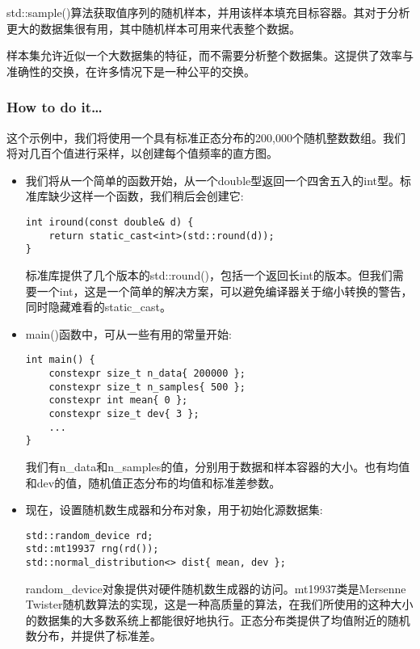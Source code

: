 
std::sample()算法获取值序列的随机样本，并用该样本填充目标容器。其对于分析更大的数据集很有用，其中随机样本可用来代表整个数据。

样本集允许近似一个大数据集的特征，而不需要分析整个数据集。这提供了效率与准确性的交换，在许多情况下是一种公平的交换。

\subsubsection{How to do it…}

这个示例中，我们将使用一个具有标准正态分布的200,000个随机整数数组。我们将对几百个值进行采样，以创建每个值频率的直方图。

\begin{itemize}
\item 
我们将从一个简单的函数开始，从一个double型返回一个四舍五入的int型。标准库缺少这样一个函数，我们稍后会创建它:

\begin{lstlisting}[style=styleCXX]
int iround(const double& d) {
	return static_cast<int>(std::round(d));
}
\end{lstlisting}

标准库提供了几个版本的std::round()，包括一个返回长int的版本。但我们需要一个int，这是一个简单的解决方案，可以避免编译器关于缩小转换的警告，同时隐藏难看的static\_cast。

\item 
main()函数中，可从一些有用的常量开始:

\begin{lstlisting}[style=styleCXX]
int main() {
	constexpr size_t n_data{ 200000 };
	constexpr size_t n_samples{ 500 };
	constexpr int mean{ 0 };
	constexpr size_t dev{ 3 };
	...
}
\end{lstlisting}

我们有n\_data和n\_samples的值，分别用于数据和样本容器的大小。也有均值和dev的值，随机值正态分布的均值和标准差参数。

\item 
现在，设置随机数生成器和分布对象，用于初始化源数据集:

\begin{lstlisting}[style=styleCXX]
std::random_device rd;
std::mt19937 rng(rd());
std::normal_distribution<> dist{ mean, dev };
\end{lstlisting}

random\_device对象提供对硬件随机数生成器的访问。mt19937类是Mersenne Twister随机数算法的实现，这是一种高质量的算法，在我们所使用的这种大小的数据集的大多数系统上都能很好地执行。正态分布类提供了均值附近的随机数分布，并提供了标准差。


\end{itemize}
